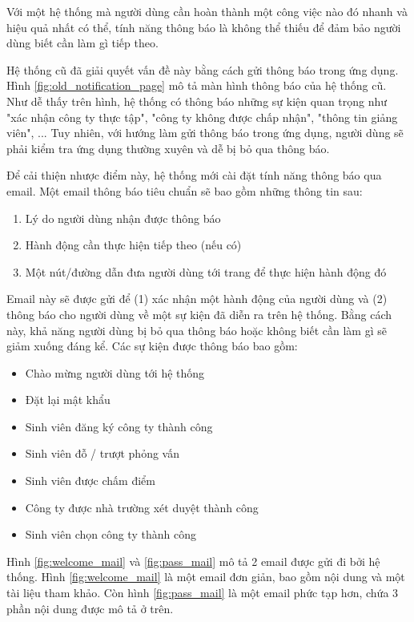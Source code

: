 \documentclass[./../main.tex]{subfiles}
\begin{document}
Với một hệ thống mà người dùng cần hoàn thành một công việc nào đó nhanh và hiệu quả nhất có thể, tính năng thông báo là không thể thiếu để đảm bảo người dùng biết cần làm gì tiếp theo.

Hệ thống cũ đã giải quyết vấn đề này bằng cách gửi thông báo trong ứng dụng. Hình \ref{fig:old_notification_page} mô tả màn hình thông báo của hệ thống cũ. Như dễ thấy trên hình, hệ thống có thông báo những sự kiện quan trọng như "xác nhận công ty thực tập", "công ty không được chấp nhận", "thông tin giảng viên", ... Tuy nhiên, với hướng làm gửi thông báo trong ứng dụng, người dùng sẽ phải kiểm tra ứng dụng thường xuyên và dễ bị bỏ qua thông báo.

Để cải thiện nhược điểm này, hệ thống mới cài đặt tính năng thông báo qua email. Một email thông báo tiêu chuẩn sẽ bao gồm những thông tin sau:

\begin{enumerate}
  \item Lý do người dùng nhận được thông báo
  \item Hành động cần thực hiện tiếp theo (nếu có)
  \item Một nút/đường dẫn đưa người dùng tới trang để thực hiện hành động đó
\end{enumerate}

Email này sẽ được gửi để (1) xác nhận một hành động của người dùng và (2) thông báo cho người dùng về một sự kiện đã diễn ra trên hệ thống. Bằng cách này, khả năng người dùng bị bỏ qua thông báo hoặc không biết cần làm gì sẽ giảm xuống đáng kể. Các sự kiện được thông báo bao gồm:

\begin{itemize}
\item
  Chào mừng người dùng tới hệ thống
\item
  Đặt lại mật khẩu
\item
  Sinh viên đăng ký công ty thành công
\item
  Sinh viên đỗ / trượt phỏng vấn
\item
  Sinh viên được chấm điểm
\item
  Công ty được nhà trường xét duyệt thành công
\item
  Sinh viên chọn công ty thành công
\end{itemize}

Hình \ref{fig:welcome_mail} và \ref{fig:pass_mail} mô tả 2 email được gửi đi bởi hệ thống. Hình \ref{fig:welcome_mail} là một email đơn giản, bao gồm nội dung và một tài liệu tham khảo. Còn hình \ref{fig:pass_mail} là một email phức tạp hơn, chứa 3 phần nội dung được mô tả ở trên.
\end{document}
